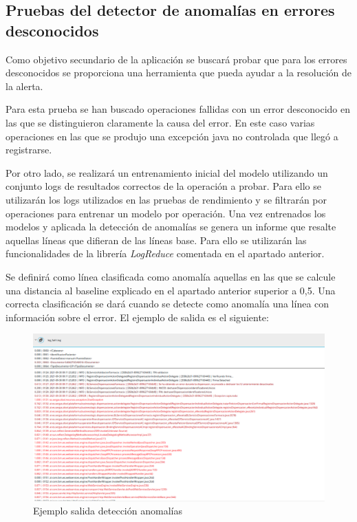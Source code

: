 \subsection{Pruebas del detector de anomalías en errores desconocidos}

Como objetivo secundario de la aplicación se buscará probar que para los errores desconocidos se proporciona una herramienta que pueda ayudar a la resolución de la alerta.

Para esta prueba se han buscado operaciones fallidas con un error desconocido en las que se distinguieron claramente la causa del error. En este caso varias operaciones en las que se produjo una excepción java no controlada que llegó a registrarse.

Por otro lado, se realizará un entrenamiento inicial del modelo utilizando un conjunto logs de resultados correctos de la operación a probar. Para ello se utilizarán los logs utilizados en las pruebas de rendimiento y se filtrarán por operaciones para entrenar un modelo por operación. Una vez entrenados los modelos y aplicada la detección de anomalías se genera un informe que resalte aquellas líneas que difieran de las líneas base. Para ello se utilizarán las funcionalidades de la librería \textit{LogReduce} comentada en el apartado anterior.

Se definirá como línea clasificada como anomalía aquellas en las que se calcule una distancia al baseline explicado en el apartado anterior superior a 0,5. Una correcta clasificación se dará cuando se detecte como anomalía una línea con información sobre el error. El ejemplo de salida es el siguiente:

\begin{figure}[H]
\centerline{\includegraphics[width=15cm]{figuras/report.png}}
\caption{Ejemplo salida detección anomalías}
\label{enlace1}
\end{figure}

